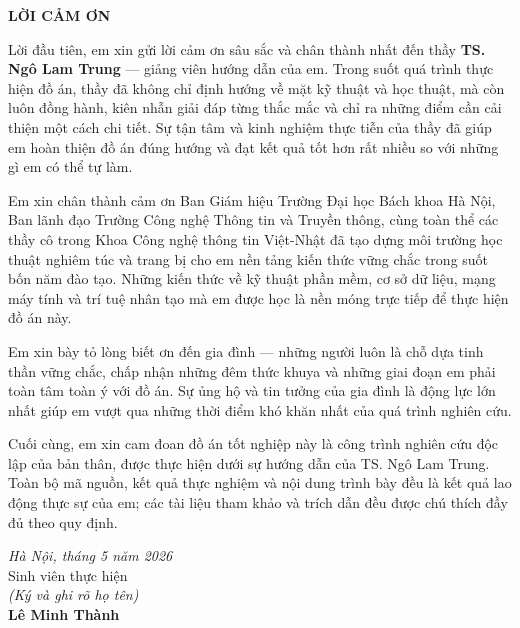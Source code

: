 \documentclass[../DoAn.tex]{subfiles}
\begin{document}
\begin{center}
    \Large{\textbf{LỜI CẢM ƠN}}\\
\end{center}
\vspace{1cm}

Lời đầu tiên, em xin gửi lời cảm ơn sâu sắc và chân thành nhất đến thầy \textbf{TS. Ngô Lam Trung} --- giảng viên hướng dẫn của em. Trong suốt quá trình thực hiện đồ án, thầy đã không chỉ định hướng về mặt kỹ thuật và học thuật, mà còn luôn đồng hành, kiên nhẫn giải đáp từng thắc mắc và chỉ ra những điểm cần cải thiện một cách chi tiết. Sự tận tâm và kinh nghiệm thực tiễn của thầy đã giúp em hoàn thiện đồ án đúng hướng và đạt kết quả tốt hơn rất nhiều so với những gì em có thể tự làm.

Em xin chân thành cảm ơn Ban Giám hiệu Trường Đại học Bách khoa Hà Nội, Ban lãnh đạo Trường Công nghệ Thông tin và Truyền thông, cùng toàn thể các thầy cô trong Khoa Công nghệ thông tin Việt-Nhật đã tạo dựng môi trường học thuật nghiêm túc và trang bị cho em nền tảng kiến thức vững chắc trong suốt bốn năm đào tạo. Những kiến thức về kỹ thuật phần mềm, cơ sở dữ liệu, mạng máy tính và trí tuệ nhân tạo mà em được học là nền móng trực tiếp để thực hiện đồ án này.

Em xin bày tỏ lòng biết ơn đến gia đình --- những người luôn là chỗ dựa tinh thần vững chắc, chấp nhận những đêm thức khuya và những giai đoạn em phải toàn tâm toàn ý với đồ án. Sự ủng hộ và tin tưởng của gia đình là động lực lớn nhất giúp em vượt qua những thời điểm khó khăn nhất của quá trình nghiên cứu.

Cuối cùng, em xin cam đoan đồ án tốt nghiệp này là công trình nghiên cứu độc lập của bản thân, được thực hiện dưới sự hướng dẫn của TS. Ngô Lam Trung. Toàn bộ mã nguồn, kết quả thực nghiệm và nội dung trình bày đều là kết quả lao động thực sự của em; các tài liệu tham khảo và trích dẫn đều được chú thích đầy đủ theo quy định.

\vspace{1.5cm}
\begin{flushright}
\textit{Hà Nội, tháng 5 năm 2026}\\[0.5cm]
Sinh viên thực hiện\\[0.5cm]
\textit{(Ký và ghi rõ họ tên)}\\[1cm]
\textbf{Lê Minh Thành}
\end{flushright}
\end{document}
